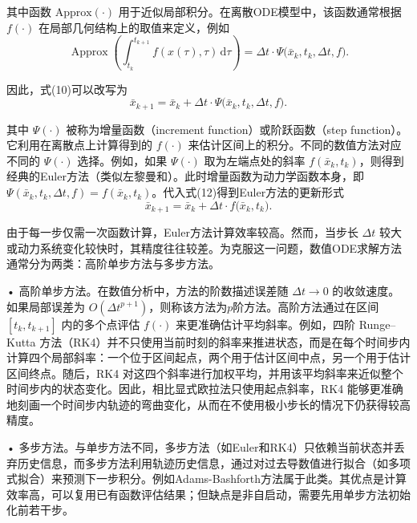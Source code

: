 其中函数 $\mathrm{Approx}(\cdot)$ 用于近似局部积分。在离散ODE模型中，该函数通常根据 $f(\cdot)$ 在局部几何结构上的取值来定义，例如
\begin{equation}
\operatorname{Approx}
\left(
\int_{t_k}^{t_{k+1}}
f(x(\tau),\tau)\,\mathrm{d}\tau
\right)
=
\Delta t \cdot
\Psi\bigl(\bar{x}_k,t_k,\Delta t,f\bigr).
\label{eq:approx-integral-psi}
\end{equation}

因此，式(10)可以改写为
\begin{equation}
\bar{x}_{k+1}
=
\bar{x}_k
+
\Delta t \cdot
\Psi\bigl(\bar{x}_k,t_k,\Delta t,f\bigr).
\label{eq:general-ode-solver-update}
\end{equation}

其中 $\Psi(\cdot)$ 被称为增量函数（increment function）或阶跃函数（step function）。它利用在离散点上计算得到的 $f(\cdot)$ 来估计区间上的积分。不同的数值方法对应不同的 $\Psi(\cdot)$ 选择。例如，如果 $\Psi(\cdot)$ 取为左端点处的斜率 $f(\bar{x}_k,t_k)$，则得到经典的Euler方法（类似左黎曼和）。此时增量函数为动力学函数本身，即 $\Psi(\bar{x}_k,t_k,\Delta t,f)=f(\bar{x}_k,t_k)$。代入式(12)得到Euler方法的更新形式
\begin{equation}
\bar{x}_{k+1}
=
\bar{x}_k
+
\Delta t \cdot
f\bigl(\bar{x}_k,t_k\bigr).
\label{eq:euler-method-update}
\end{equation}

由于每一步仅需一次函数计算，Euler方法计算效率较高。然而，当步长 $\Delta t$ 较大或动力系统变化较快时，其精度往往较差。为克服这一问题，数值ODE求解方法通常分为两类：高阶单步方法与多步方法。

• 高阶单步方法。在数值分析中，方法的阶数描述误差随 $\Delta t\to 0$ 的收敛速度。如果局部误差为 $O(\Delta t^{p+1})$，则称该方法为$p$阶方法。高阶方法通过在区间 $[t_k,t_{k+1}]$ 内的多个点评估 $f(\cdot)$ 来更准确估计平均斜率。例如，四阶 Runge--Kutta 方法（RK4）并不只使用当前时刻的斜率来推进状态，而是在每个时间步内计算四个局部斜率：一个位于区间起点，两个用于估计区间中点，另一个用于估计区间终点。随后，RK4 对这四个斜率进行加权平均，并用该平均斜率来近似整个时间步内的状态变化。因此，相比显式欧拉法只使用起点斜率，RK4 能够更准确地刻画一个时间步内轨迹的弯曲变化，从而在不使用极小步长的情况下仍获得较高精度。

• 多步方法。与单步方法不同，多步方法（如Euler和RK4）只依赖当前状态并丢弃历史信息，而多步方法利用轨迹历史信息，通过对过去导数值进行拟合（如多项式拟合）来预测下一步积分。例如Adams-Bashforth方法属于此类。其优点是计算效率高，可以复用已有函数评估结果；但缺点是非自启动，需要先用单步方法初始化前若干步。

